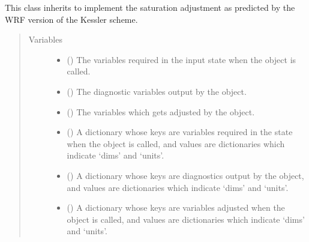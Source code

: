 \documentclass[letterpaper,10pt,english]{sphinxmanual}
\begin{document}
\begin{fulllineitems}
\label{\detokenize{api:tasmania.parameterizations.adjustment_microphysics_kessler_wrf_saturation.AdjustmentMicrophysicsKesslerWRFSaturation}}
This class inherits {\hyperref[\detokenize{api:tasmania.parameterizations.adjustments.AdjustmentMicrophysics}]{}}
to implement the saturation adjustment as predicted by the WRF version of the Kessler scheme.
\begin{quote}\begin{description}
\item[{Variables}] \leavevmode\begin{itemize}
\item {} 
 () \textendash{} The variables required in the input state when the object is called.

\item {} 
 () \textendash{} The diagnostic variables output by the object.

\item {} 
 () \textendash{} The variables which gets adjusted by the object.

\item {} 
 () \textendash{} A dictionary whose keys are variables required in the state when the object is called,
and values are dictionaries which indicate ‘dims’ and ‘units’.

\item {} 
 () \textendash{} A dictionary whose keys are diagnostics output by the object,
and values are dictionaries which indicate ‘dims’ and ‘units’.

\item {} 
 () \textendash{} A dictionary whose keys are variables adjusted when the object is called,
and values are dictionaries which indicate ‘dims’ and ‘units’.


\end{itemize}
\end{description}
\end{quote}
\end{fulllineitems}
\end{document}
